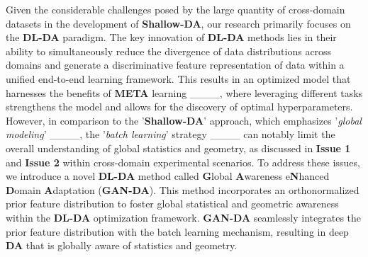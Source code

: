 Given the considerable challenges posed by the large quantity of cross-domain datasets in the development of \textbf{Shallow-DA}, our research primarily focuses on the \textbf{DL-DA} paradigm. The key innovation of \textbf{DL-DA} methods lies in their ability to simultaneously reduce the divergence of data distributions across domains and generate a discriminative feature representation of data within a unified end-to-end learning framework. This results in an optimized model that harnesses the benefits of \textbf{META} learning ____, where leveraging different tasks strengthens the model and allows for the discovery of optimal hyperparameters. However, in comparison to the '\textbf{Shallow-DA}' approach, which emphasizes '\textit{global modeling}' ____, the '\textit{batch learning}' strategy ____ can notably limit the overall understanding of global statistics and geometry, as discussed in \textbf{Issue 1} and \textbf{Issue 2} within cross-domain experimental scenarios. To address these issues, we introduce a novel \textbf{DL-DA} method called \textbf{G}lobal \textbf{A}wareness e\textbf{N}hanced \textbf{D}omain \textbf{A}daptation (\textbf{GAN-DA}). This method incorporates an orthonormalized prior feature distribution to foster global statistical and geometric awareness within the \textbf{DL-DA} optimization framework. \textbf{GAN-DA} seamlessly integrates the prior feature distribution with the batch learning mechanism, resulting in deep \textbf{DA} that is globally aware of statistics and geometry.